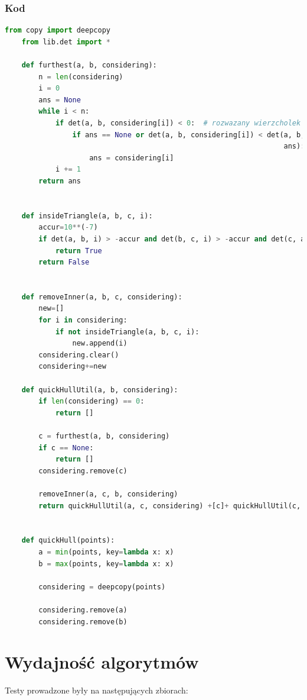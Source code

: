 \documentclass[11pt]{article}
\theoremstyle{remark} \newtheorem{definition}{def.}
\theoremstyle{definition} \newtheorem{twierdzenie}{tw.}
\begin{document}
    \subsubsection{Kod}
\begin{lstlisting}[language=Python]
    from copy import deepcopy
    from lib.det import *
    
    def furthest(a, b, considering):
        n = len(considering)
        i = 0
        ans = None
        while i < n:
            if det(a, b, considering[i]) < 0:  # rozwazany wierzcholek jest po prawej stronie ab
                if ans == None or det(a, b, considering[i]) < det(a, b,
                                                                  ans):  # |det(a,b,c)| = 1/2|ab|*h, gdzie h jest wysokoscia z c na ab
                    ans = considering[i]
            i += 1
        return ans
    
    
    def insideTriangle(a, b, c, i):
        accur=10**(-7)
        if det(a, b, i) > -accur and det(b, c, i) > -accur and det(c, a, i) > -accur:
            return True
        return False
    
    
    def removeInner(a, b, c, considering):
        new=[]
        for i in considering:
            if not insideTriangle(a, b, c, i):
                new.append(i)
        considering.clear()
        considering+=new
    
    def quickHullUtil(a, b, considering):
        if len(considering) == 0:
            return []
    
        c = furthest(a, b, considering)
        if c == None:
            return []
        considering.remove(c)
    
        removeInner(a, c, b, considering)
        return quickHullUtil(a, c, considering) +[c]+ quickHullUtil(c, b, considering)
    
    
    def quickHull(points):
        a = min(points, key=lambda x: x)
        b = max(points, key=lambda x: x)
    
        considering = deepcopy(points)
    
        considering.remove(a)
        considering.remove(b)
\end{lstlisting}

 \medskip

\section{Wydajność algorytmów}

Testy prowadzone były na następujących zbiorach:
\end{document}
